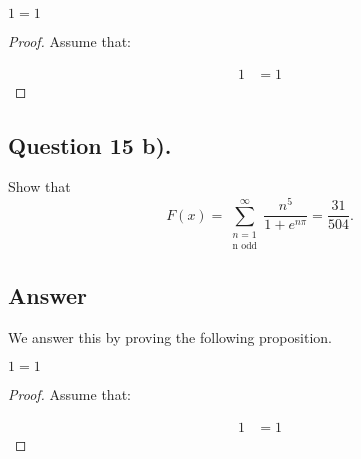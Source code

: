 \begin{proposition}
    $1=1$
\end{proposition}

\begin{proof}
    Assume that:

    \begin{align*}
        1 &= 1
    \end{align*}

\end{proof}


\subsection{Question 15 b).}
\noindent
Show that
\[
    F(x)=\sum_{\substack{n=1\\ \text{n odd}}}^{\infty} \frac{n^5}{1+e^{n\pi}} = \frac{31}{504}.
\]

\subsection*{Answer}
\noindent
We answer this by proving the following proposition.

\begin{proposition}
    $1=1$
\end{proposition}

\begin{proof}
    Assume that:

    \begin{align*}
        1 &= 1
    \end{align*}

\end{proof}
